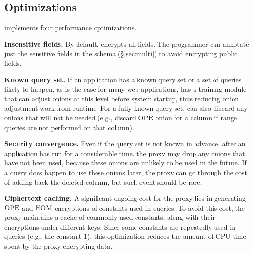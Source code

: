 \subsection{Optimizations}
\label{ss:optimize}

\name{} implements four performance optimizations.

\textbf{Insensitive fields.} By default, \name{} encrypts all fields. 
The programmer can annotate just the sensitive fields in the schema
(\S\ref{sec:multi}) to avoid encrypting public fields.

\textbf{Known query set.}  If an application has a known query set or a set of queries likely to happen, as is the case for many web applications, \name{} has a training module that can adjust onions at this level before system startup, thus reducing onion adjustment work from runtime. For a fully known query set, \name{} can also discard any onions that will not be needed (e.g., discard $\textrm{OPE}$ onion for a column if range queries are not performed on that column).


\textbf{Security convergence.}  Even if the query set is not known in
advance, after an application has run for a considerable time, the
proxy may drop any onions that have not been used, because these
onions are unlikely to be used in the future.  If a query does happen
to use these onions later, the proxy can go through the cost of
adding back the deleted column, but such event should be rare.

\textbf{Ciphertext caching.}  A significant ongoing cost for the proxy
lies in generating $\textrm{OPE}$ and $\textrm{HOM}$ encryptions of constants used in
queries.  To avoid this cost, the proxy maintains a cache of
commonly-used constants, along with their encryptions under different
keys.  Since some constants are repeatedly used in queries (e.g.,
the constant 1), this optimization reduces the amount of CPU time
spent by the proxy encrypting data.

